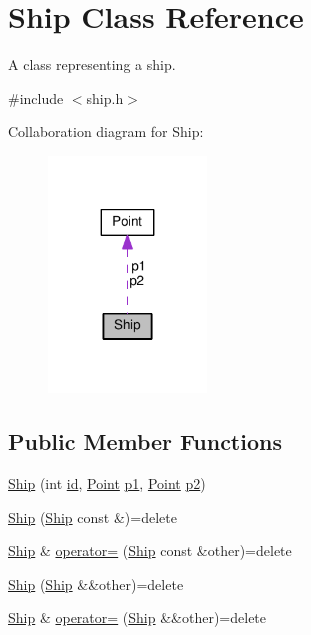 \hypertarget{classMODEL_1_1Ship}{}\section{Ship Class Reference}
\label{classMODEL_1_1Ship}


A class representing a ship.  




{\ttfamily \#include $<$ship.\+h$>$}



Collaboration diagram for Ship\+:\nopagebreak
\begin{figure}[H]
\begin{center}
\leavevmode
\includegraphics[width=119pt]{classMODEL_1_1Ship__coll__graph}
\end{center}
\end{figure}
\subsection*{Public Member Functions}
\begin{DoxyCompactItemize}
\item 
\hyperlink{classMODEL_1_1Ship_a8b83f3c2ed4f9097d7010a8f58b720e6}{Ship} (int \hyperlink{classMODEL_1_1Ship_a7441ef0865bcb3db9b8064dd7375c1ea}{id}, \hyperlink{classMODEL_1_1Point}{Point} \hyperlink{classMODEL_1_1Ship_ad513d6f843f1e0539132467d503e4591}{p1}, \hyperlink{classMODEL_1_1Point}{Point} \hyperlink{classMODEL_1_1Ship_a04aa64d0927f4422e811828cbe685358}{p2})
\item 
\hyperlink{classMODEL_1_1Ship_a5575ed570a5875b1c5828778b5d699aa}{Ship} (\hyperlink{classMODEL_1_1Ship}{Ship} const \&)=delete
\item 
\hyperlink{classMODEL_1_1Ship}{Ship} \& \hyperlink{classMODEL_1_1Ship_a00a328059de82741d06a9b59f599eb00}{operator=} (\hyperlink{classMODEL_1_1Ship}{Ship} const \&other)=delete
\item 
\hyperlink{classMODEL_1_1Ship_a8415fb9e85dd2049357fa6718d603516}{Ship} (\hyperlink{classMODEL_1_1Ship}{Ship} \&\&other)=delete
\item 
\hyperlink{classMODEL_1_1Ship}{Ship} \& \hyperlink{classMODEL_1_1Ship_a662d48126ddb24366430c841951c4760}{operator=} (\hyperlink{classMODEL_1_1Ship}{Ship} \&\&other)=delete
\end{DoxyCompactItemize}
